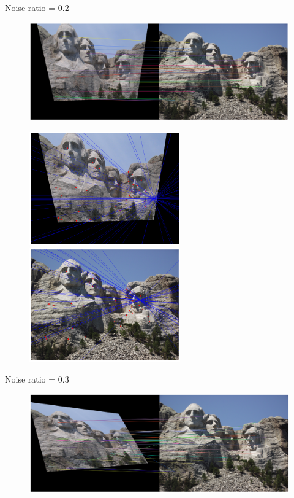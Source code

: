 \documentclass[11pt]{article}
\begin{document}
Noise ratio = 0.2
\begin{figure}[H]
    \centering
    \includegraphics[width=14cm]{images/part3/no_ransac_image_1_noise_0.2_1.png}
\end{figure}

\begin{figure}[H]
    \centering
    \includegraphics[width=6.5cm]{images/part3/no_ransac_image_1_noise_0.2_left.png}
    \includegraphics[width=6.5cm]{images/part3/no_ransac_image_1_noise_0.2_right.png}
\end{figure}

Noise ratio = 0.3
\begin{figure}[H]
    \centering
    \includegraphics[width=14cm]{images/part3/no_ransac_image_1_noise_0.3_1.png}
\end{figure}
\end{document}
